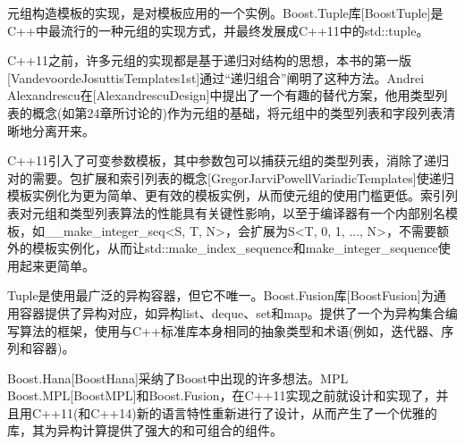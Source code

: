 
元组构造模板的实现，是对模板应用的一个实例。Boost.Tuple库[BoostTuple]是C++中最流行的一种元组的实现方式，并最终发展成C++11中的std::tuple。

C++11之前，许多元组的实现都是基于递归对结构的思想，本书的第一版[VandevoordeJosuttisTemplates1st]通过“递归组合”阐明了这种方法。Andrei Alexandrescu在[AlexandrescuDesign]中提出了一个有趣的替代方案，他用类型列表的概念(如第24章所讨论的)作为元组的基础，将元组中的类型列表和字段列表清晰地分离开来。

C++11引入了可变参数模板，其中参数包可以捕获元组的类型列表，消除了递归对的需要。包扩展和索引列表的概念[GregorJarviPowellVariadicTemplates]使递归模板实例化为更为简单、更有效的模板实例，从而使元组的使用门槛更低。索引列表对元组和类型列表算法的性能具有关键性影响，以至于编译器有一个内部别名模板，如\_\_make\_integer\_seq<S, T, N>，会扩展为S<T, 0, 1, ..., N>，不需要额外的模板实例化，从而让std::make\_index\_sequence和make\_integer\_sequence使用起来更简单。

Tuple是使用最广泛的异构容器，但它不唯一。Boost.Fusion库[BoostFusion]为通用容器提供了异构对应，如异构list、deque、set和map。提供了一个为异构集合编写算法的框架，使用与C++标准库本身相同的抽象类型和术语(例如，迭代器、序列和容器)。

Boost.Hana[BoostHana]采纳了Boost中出现的许多想法。MPL Boost.MPL[BoostMPL]和Boost.Fusion，在C++11实现之前就设计和实现了，并且用C++11(和C++14)新的语言特性重新进行了设计，从而产生了一个优雅的库，其为异构计算提供了强大的和可组合的组件。